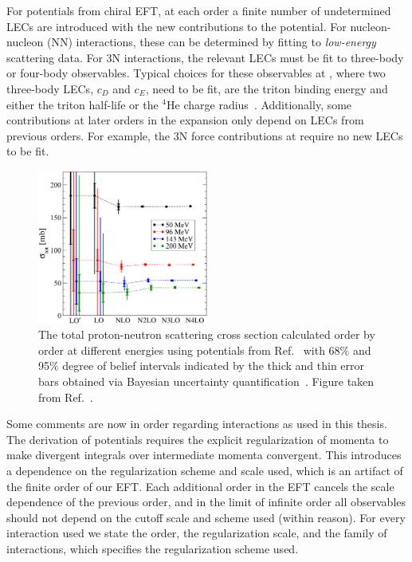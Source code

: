 For potentials from chiral EFT,
at each order a finite number of undetermined LECs are introduced with the new contributions to the potential.
For nucleon-nucleon (NN) interactions, these can be determined by fitting to \textit{low-energy} scattering data.
For 3N interactions, the relevant LECs must be fit to three-body or four-body observables.
Typical choices for these observables at \ntwolo{}, where two three-body LECs, $c_D$ and $c_E$, need to be fit,
are the triton binding energy and either the triton half-life or the ${}^4\text{He}$ charge radius~\cite{Hebe20habi}.
Additionally, some contributions at later orders in the expansion only depend on LECs from previous orders.
For example, the 3N force contributions at \nthreelo{} require no new LECs to be fit.

\begin{figure}[t!]
  \centering
  \includegraphics[width=0.5\textwidth]{thesis/doc/images/external/EKM_Tlab_together_setA_eps_approx0.pdf}
  \caption[
    The total proton-neutron scattering cross section
    calculated order by order at different energies
    using chiral potentials
    with 68\% and 95\% degree of belief intervals
    indicated by the thick and thin error bars
    obtained via Bayesian uncertainty quantification.
  ]{
    The total proton-neutron scattering cross section
    calculated order by order at different energies
    using potentials from Ref.~\cite{Epel14ekm2}
    with 68\% and 95\% degree of belief intervals
    indicated by the thick and thin error bars
    obtained via Bayesian uncertainty quantification~\cite{Furn15bayesuq}.
    Figure taken from Ref.~\cite{Furn15bayesuq}.
  }\label{fig:chieft_uq}
\end{figure}

Some comments are now in order regarding interactions as used in this thesis.
The derivation of potentials requires the explicit regularization of momenta
to make divergent integrals over intermediate momenta convergent.
This introduces a dependence on the regularization scheme and scale used,
which is an artifact of the finite order of our EFT.\@
Each additional order in the EFT cancels the scale dependence of the previous order,
and in the limit of infinite order all observables
should not depend on the cutoff scale and scheme used (within reason).
For every interaction used we state the order, the regularization scale,
and the family of interactions, which specifies the regularization scheme used.

